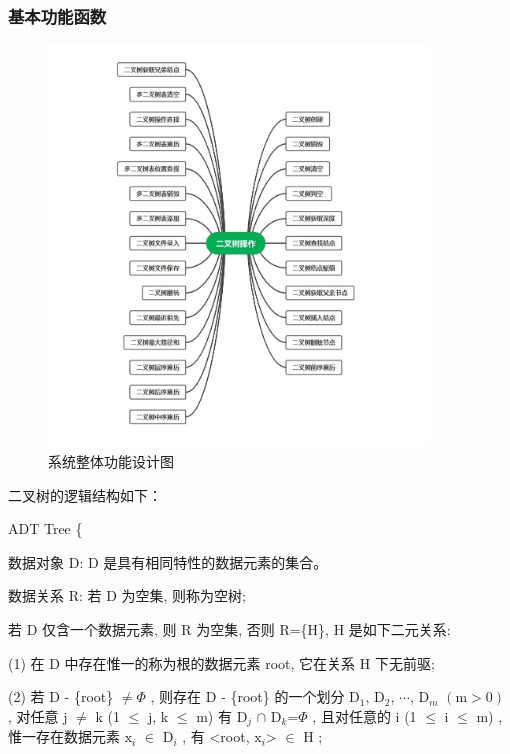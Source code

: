 \documentclass[supercite]{Experimental_Report}
\theoremstyle{definition}
\begin{document}
\subsubsection{基本功能函数}

 \begin{figure}[H]
 	\centering
 	\includegraphics[width=0.9\textwidth]{images/二叉树操作.jpg}
 	\caption{系统整体功能设计图}
 	\label{txlab}
 \end{figure}

二叉树的逻辑结构如下：

ADT Tree \{

数据对象  $\mathrm{D}$: $\mathrm{D}$  是具有相同特性的数据元素的集合。

数据关系  R:  若  D  为空集, 则称为空树;

若  D  仅含一个数据元素, 则  R  为空集, 否则  R=\{H\}, H  是如下二元关系:

(1) 在 D 中存在惟一的称为根的数据元素 root, 它在关系  $\mathrm{H}$  下无前驱;

(2) 若  D - \{root\} $\neq \Phi$ , 则存在   D - \{root\}  的一个划分  $\mathrm{D}_{1}$, $\mathrm{D}_{2}$, $\cdots$, $\mathrm{D}_{m}$ $(\mathrm{m}>0)$ , 对任意  j $\neq$ k (1 $\leq$   j, k $\leq$ m)  有  $\mathrm{D}_{j}$ $\cap$ $\mathrm{D}_{k}$=$\Phi$ , 且对任意的  i (1 $\leq$ i $\leq$ m) , 惟一存在数据元素  $\mathrm{x}_{i}$ $\in$ $\mathrm{D}_{i}$ , 有  <root, $\mathrm{x}_{i}$> $\in$ $\mathrm{H}$ ;
\end{document}
